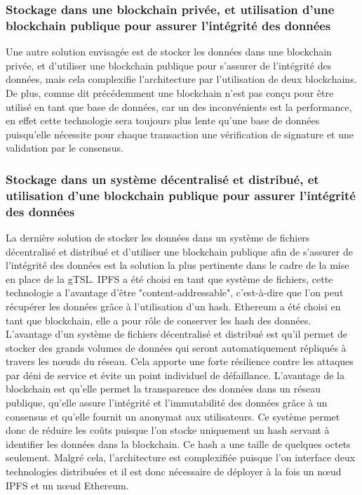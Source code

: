\documentclass{tnreport}
\begin{document}
\subsubsection{Stockage dans une blockchain privée, et utilisation d'une blockchain publique pour assurer l'intégrité des données}

Une autre solution envisagée est de stocker les données dans une blockchain privée, et d'utiliser une blockchain publique pour s'assurer de l'intégrité des données, mais cela complexifie l'architecture par l'utilisation de deux blockchains. De plus, comme dit précédemment une blockchain n'est pas conçu pour être utilisé en tant que base de données, car un des inconvénients est la performance, en effet cette technologie sera toujours plus lente qu'une base de données puisqu'elle nécessite pour chaque transaction une vérification de signature et une validation par le consensus. 

\subsubsection{Stockage dans un système décentralisé et distribué, et utilisation d'une blockchain publique pour assurer l'intégrité des données}

La dernière solution de stocker les données dans un système de fichiers décentralisé et distribué et d'utiliser une blockchain publique afin de s'assurer de l'intégrité des données est la solution la plus pertinente dans le cadre de la mise en place de la gTSL. 
IPFS a été choisi en tant que système de fichiers, cette technologie a l'avantage d'être "content-addressable", c'est-à-dire que l'on peut récupérer les données grâce à l'utilisation d'un hash.
Ethereum a été choisi en tant que blockchain, elle a pour rôle de conserver les hash des données.
L'avantage d'un système de fichiers décentralisé et distribué est qu'il permet de stocker des grands volumes de données qui seront automatiquement répliqués à travers les nœuds du réseau. Cela apporte une forte résilience contre les attaques par déni de service et évite un point individuel de défaillance.
L'avantage de la blockchain est qu'elle permet la transparence des données dans un réseau publique, qu'elle assure l'intégrité et l'immutabilité des données grâce à un consensus et qu'elle fournit un anonymat aux utilisateurs.
Ce système permet donc de réduire les coûts puisque l'on stocke uniquement un hash servant à identifier les données dans la blockchain. Ce hash a une taille de quelques octets seulement.
Malgré cela, l'architecture est complexifiée puisque l'on interface deux technologies distribuées et il est donc nécessaire de déployer à la fois un nœud IPFS et un nœud Ethereum.
\end{document}
